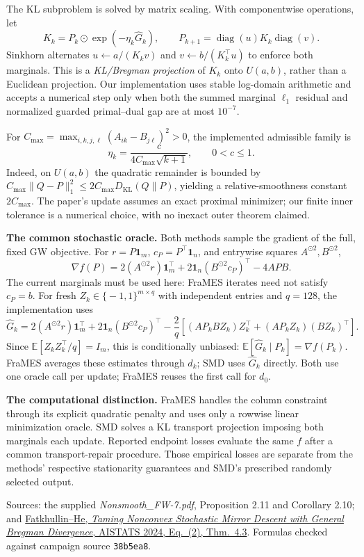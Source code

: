 \documentclass[11pt,a4paper]{article}
\newcommand{\one}{\mathbf{1}}
\newcommand{\KL}{D_{\mathrm{KL}}}
\begin{document}
The KL subproblem is solved by matrix scaling. With componentwise operations, let
\[
 K_k=P_k\odot\exp(-\eta_k\widehat G_k),\qquad
 P_{k+1}=\operatorname{diag}(u)K_k\operatorname{diag}(v).
\]
Sinkhorn alternates $u\leftarrow a/(K_kv)$ and $v\leftarrow b/(K_k^\top u)$ to enforce both marginals. This is a \emph{KL/Bregman projection} of $K_k$ onto $U(a,b)$, rather than a Euclidean projection. Our implementation uses stable log-domain arithmetic and accepts a numerical step only when both the summed marginal $\ell_1$ residual and normalized guarded primal--dual gap are at most $10^{-7}$.

For $C_{\max}=\max_{i,k,j,\ell}(A_{ik}-B_{j\ell})^2>0$, the implemented admissible family is
\[
 \eta_k=\frac{c}{4C_{\max}\sqrt{k+1}},\qquad 0<c\leq1.
\]
Indeed, on $U(a,b)$ the quadratic remainder is bounded by
$C_{\max}\|Q-P\|_1^2\leq2C_{\max}\KL(Q\|P)$, yielding a relative-smoothness constant $2C_{\max}$. The paper's update assumes an exact proximal minimizer; our finite inner tolerance is a numerical choice, with no inexact outer theorem claimed.

\textbf{The common stochastic oracle.}
Both methods sample the gradient of the full, fixed GW objective. For
$r=P\one_m$, $c_P=P^\top\one_n$, and entrywise squares $A^{\odot2},B^{\odot2}$,
\[
 \nabla f(P)=2(A^{\odot2}r)\one_m^\top
          +2\one_n(B^{\odot2}c_P)^\top-4APB.
\]
The current marginals must be used here: FraMES iterates need not satisfy $c_P=b$.
For fresh $Z_k\in\{\!-1,1\}^{m\times q}$ with independent entries and $q=128$, the implementation uses
\[
 \widehat G_k=2(A^{\odot2}r)\one_m^\top
 +2\one_n(B^{\odot2}c_P)^\top
 -\frac{2}{q}\left[(AP_kBZ_k)Z_k^\top+(AP_kZ_k)(BZ_k)^\top\right].
\]
Since $\mathbb E[Z_kZ_k^\top/q]=I_m$, this is conditionally unbiased:
$\mathbb E[\widehat G_k\mid P_k]=\nabla f(P_k)$. FraMES averages these estimates through $d_k$; SMD uses $\widehat G_k$ directly. Both use one oracle call per update; FraMES reuses the first call for $d_0$.

\textbf{The computational distinction.}
FraMES handles the column constraint through its explicit quadratic penalty and uses only a rowwise linear minimization oracle. SMD solves a KL transport projection imposing both marginals each update. Reported endpoint losses evaluate the same $f$ after a common transport-repair procedure. Those empirical losses are separate from the methods' respective stationarity guarantees and SMD's prescribed randomly selected output.

\vfill
{\small Sources: the supplied \emph{Nonsmooth\_FW-7.pdf}, Proposition 2.11 and Corollary 2.10; and
\href{https://proceedings.mlr.press/v238/fatkhullin24a/fatkhullin24a.pdf}{Fatkhullin--He, \emph{Taming Nonconvex Stochastic Mirror Descent with General Bregman Divergence}, AISTATS 2024, Eq.~(2), Thm.~4.3}.
Formulas checked against campaign source \texttt{38b5ea8}.}
\end{document}
